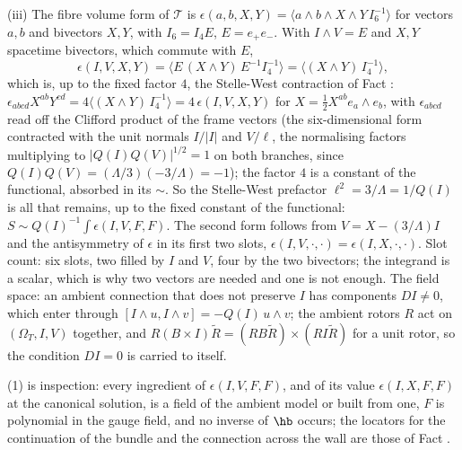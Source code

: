 (iii) The fibre volume form of $\mathcal{T}$ is $\epsilon(a, b, X, Y) = \langle a\wedge b\wedge X\wedge Y\,I_{6}^{-1}\rangle$ for vectors $a, b$ and bivectors $X, Y$, with $I_{6} = I_{4}E$, $E = e_{+}e_{-}$. With $I\wedge V = E$ and $X, Y$ spacetime bivectors, which commute with $E$,
\[
\epsilon(I, V, X, Y) = \langle E\,(X\wedge Y)\,E^{-1}I_{4}^{-1}\rangle = \langle (X\wedge Y)\,I_{4}^{-1}\rangle ,
\]
which is, up to the fixed factor $4$, the Stelle-West contraction of Fact : $\epsilon_{abcd}X^{ab}Y^{cd} = 4\langle(X\wedge Y)\,I_{4}^{-1}\rangle = 4\,\epsilon(I, V, X, Y)$ for $X = \tfrac12X^{ab}e_{a}\wedge e_{b}$, with $\epsilon_{abcd}$ read off the Clifford product of the frame vectors (the six-dimensional form contracted with the unit normals $I/|I|$ and $V/\ell$, the normalising factors multiplying to $|Q(I)Q(V)|^{1/2} = 1$ on both branches, since $Q(I)Q(V) = (\Lambda/3)(-3/\Lambda) = -1$); the factor $4$ is a constant of the functional, absorbed in its $\sim$. So the Stelle-West prefactor $\ell^{2} = 3/\Lambda = 1/Q(I)$ is all that remains, up to the fixed constant of the functional: $S \sim Q(I)^{-1}\int\epsilon(I, V, F, F)$. The second form follows from $V = X - (3/\Lambda)I$ and the antisymmetry of $\epsilon$ in its first two slots, $\epsilon(I, V, \cdot, \cdot) = \epsilon(I, X, \cdot, \cdot)$. Slot count: six slots, two filled by $I$ and $V$, four by the two bivectors; the integrand is a scalar, which is why two vectors are needed and one is not enough. The field space: an ambient connection that does not preserve $I$ has components $D I \neq 0$, which enter through $[I\wedge u, I\wedge v] = -Q(I)\,u\wedge v$; the ambient rotors $R$ act on $(\Omega_{T}, I, V)$ together, and $R(B\times I)\tilde R = (RB\tilde R)\times(RI\tilde R)$ for a unit rotor, so the condition $D I = 0$ is carried to itself.

(1) is inspection: every ingredient of $\epsilon(I, V, F, F)$, and of its value $\epsilon(I, X, F, F)$ at the canonical solution, is a field of the ambient model or built from one, $F$ is polynomial in the gauge field, and no inverse of $\hb$ occurs; the locators for the continuation of the bundle and the connection across the wall are those of Fact .


